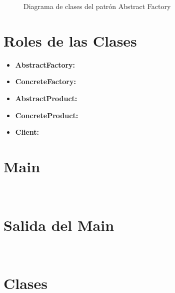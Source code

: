 \begin{figure}[H]
    \centering
    \caption{Diagrama de clases del patrón Abstract Factory}
\end{figure}


\section{Roles de las Clases}


\begin{itemize}
    \item \textbf{AbstractFactory:}
    \item \textbf{ConcreteFactory:}
    \item \textbf{AbstractProduct:}
    \item \textbf{ConcreteProduct:}
    \item \textbf{Client:}
\end{itemize}


\section{Main}


\begin{lstlisting}[language=Java, caption=NombreClase]
 
\end{lstlisting}


\section{Salida del Main}

\begin{lstlisting}[language=Java, caption=NombreClase]
 
\end{lstlisting}


\section{Clases}

